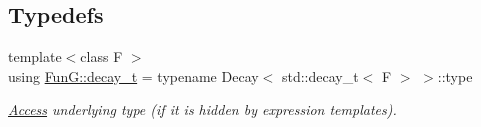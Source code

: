 \subsection*{Typedefs}
\begin{DoxyCompactItemize}
\item 
{\footnotesize template$<$class F $>$ }\\using \hyperlink{namespaceFunG_a195ac37d8696970c89b112c81a1e4d6e}{Fun\+G\+::decay\+\_\+t} = typename Decay$<$ std\+::decay\+\_\+t$<$ F $>$ $>$\+::type
\begin{DoxyCompactList}\small\item\em \hyperlink{namespaceFunG_1_1Access}{Access} underlying type (if it is hidden by expression templates). \end{DoxyCompactList}\end{DoxyCompactItemize}
